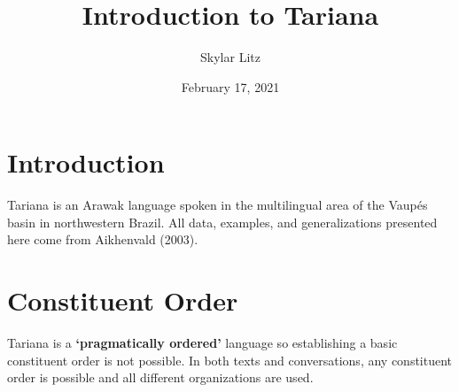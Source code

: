 \documentclass[12pt]{article}
\title{Introduction to Tariana}
\author{Skylar Litz}
\date{February 17, 2021}
\begin{document}
\maketitle


\section{Introduction}
 Tariana is an Arawak language spoken in the multilingual area of the Vaupés basin in northwestern Brazil. All data, examples, and generalizations presented here come from Aikhenvald (2003).
\section{Constituent Order}
  Tariana is a \textbf{`pragmatically ordered'} language so establishing a basic constituent order is not possible. In both texts and conversations, any constituent order is possible and all different organizations are used.
\end{document}

